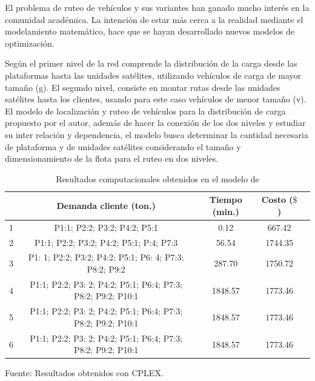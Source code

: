 El problema de ruteo de vehículos \citep{Ombuki, Yeun} y sus variantes han ganado mucho interés en la comunidad académica. La intención de estar más cerca a la realidad mediante el modelamiento matemático, hace que se hayan desarrollado nuevos modelos de optimización. \par
\vskip 0.3cm
Según \cite{Sterle} el primer nivel de la red comprende la distribución de la carga desde las plataformas hasta las unidades satélites, utilizando vehículos de carga de mayor tamaño (g).  El segundo nivel, consiste en montar rutas desde las unidades satélites hasta los clientes, usando para este caso vehículos de menor tamaño (v). El modelo de localización y ruteo de vehículos para la distribución de carga propuesto por el autor, además de hacer la conexión de los dos niveles y estudiar su inter relación y dependencia, el modelo busca determinar la cantidad necesaria de plataforma y de unidades satélites considerando el tamaño y dimensionamiento de la flota para el ruteo en dos niveles. 
\vskip 0.2cm

\begin{table}[h!]
\begin{center}
\caption{\small{Resultados computacionales obtenidos en el modelo de \cite{Sterle}}}
\end{center}
\vskip -0.7cm
\begin{tabular}{|c|c|c|c|c|}
\hline 
\rowcolor{LightBlue2}{\small Escenarios} & {\small Demanda cliente (ton.)} & {\small Tiempo (min.)} & {\small Costo ($\$$)} \\ 
\hline 
{\small 1} & {\small P1:1; P2:2; P3:2; P4:2; P5:1} & {\small 0.12} & {\small 667.42} \\ 
\hline 
{\small 2} & {\small P1:1; P2:2; P3:2; P4:2; P5:1; P:4; P7:3} & {\small 56.54} & {\small 1744.35} \\ 
\hline 
{\small 3} & {\small P1: 1; P2:2; P3:2; P4:2; P5:1; P6: 4; P7:3; P8:2; P9:2} & {\small 287.70} & {\small 1750.72} \\ 
\hline 
{\small 4} & {\small P1:1; P2:2; P3: 2; P4:2; P5:1; P6:4; P7:3; P8:2; P9:2; P10:1} & {\small 1848.57} & {\small 1773.46} \\ 
\hline 
{\small 5} & {\small P1:1; P2:2; P3: 2; P4:2; P5:1; P6:4; P7:3; P8:2; P9:2; P10:1} & {\small 1848.57} & {\small 1773.46} \\ 
\hline 
{\small 6} & {\small P1:1; P2:2; P3: 2; P4:2; P5:1; P6:4; P7:3; P8:2; P9:2; P10:1} & {\small 1848.57} & {\small 1773.46} \\ 
\hline 
\end{tabular} 
\begin{center}
\vskip -0.2cm
{\small{Fuente: Resultados obtenidos con CPLEX.}}
\end{center}
\end{table}






